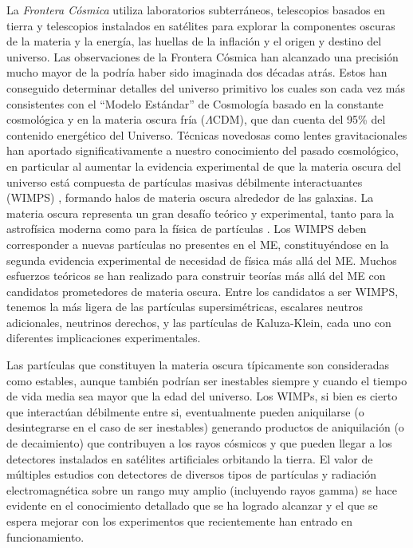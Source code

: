 La \emph{Frontera Cósmica} utiliza laboratorios subterráneos,
telescopios basados en tierra y telescopios instalados en satélites
para explorar la componentes oscuras de la materia y la energía, las huellas
de la inflación y el origen y destino del universo. Las observaciones
de la Frontera Cósmica han alcanzado una precisión mucho mayor de la
podría haber sido imaginada dos décadas atrás. Estos han conseguido
determinar detalles del universo primitivo los cuales son cada vez más
consistentes con el ``Modelo Estándar'' de Cosmología basado en la
constante cosmológica y en la materia oscura fría ($\Lambda$CDM), que
dan cuenta del 95\% del contenido energético del Universo. Técnicas
novedosas como lentes gravitacionales han aportado significativamente
a nuestro conocimiento del pasado cosmológico, en particular al
aumentar la evidencia experimental de que la materia oscura del
universo está compuesta de partículas masivas débilmente
interactuantes (WIMPS) \cite{Bertone:2004pz,Jungman:1995df}, formando
halos de materia oscura alrededor de las galaxias.
La materia oscura representa un gran desafío teórico y experimental,
tanto para la astrofísica moderna como para la física de partículas
\cite{Bertone:2004pz, Amsler:2008zzb, Bertone:2010,Jungman:1995df}.
Los WIMPS deben corresponder a nuevas partículas no presentes en el
ME, constituyéndose en la segunda evidencia experimental de necesidad
de física más allá del ME.  Muchos esfuerzos teóricos se han realizado
para construir teorías más allá del ME con candidatos
prometedores de materia oscura. Entre los candidatos a ser WIMPS,
tenemos la más ligera de las partículas supersimétricas, escalares
neutros adicionales, neutrinos derechos, y las partículas de
Kaluza-Klein, cada uno con diferentes implicaciones experimentales.


Las partículas que constituyen la materia oscura típicamente son
consideradas como estables, aunque también podrían ser
inestables siempre y cuando el tiempo de vida media sea mayor que la
edad del universo. Los WIMPs, si bien es cierto que interactúan débilmente
entre si, eventualmente pueden aniquilarse (o desintegrarse en el caso
de ser inestables) generando productos de aniquilación (o de decaimiento)
que contribuyen a los rayos cósmicos y que pueden llegar a los detectores
instalados en satélites artificiales orbitando la tierra. El valor de múltiples
estudios con detectores de diversos tipos de partículas y radiación
electromagnética sobre un rango muy amplio (incluyendo rayos gamma) se
hace evidente en el conocimiento detallado que se ha logrado alcanzar
y el que se espera mejorar con los experimentos que recientemente han
entrado en funcionamiento.

